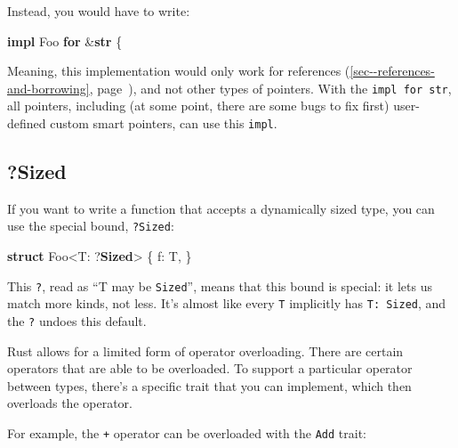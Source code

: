\documentclass[a4paper,]{book}
\renewcommand*{\hyperref}[2][\ar]{%
  \def\ar{#2}%
  #2 (\autoref{#1}, page~\pageref{#1})}
\newenvironment{Shaded}{\begin{snugshade}}{\end{snugshade}}
\newcommand{\KeywordTok}[1]{\textcolor[rgb]{0.13,0.29,0.53}{\textbf{{#1}}}}
\newcommand{\NormalTok}[1]{{#1}}
\begin{document}
Instead, you would have to write:

\begin{Shaded}
\begin{Highlighting}[]
\KeywordTok{impl} \NormalTok{Foo }\KeywordTok{for} \NormalTok{&}\KeywordTok{str} \NormalTok{\{}
\end{Highlighting}
\end{Shaded}

Meaning, this implementation would only work for
\hyperref[sec--references-and-borrowing]{references}, and not other
types of pointers. With the \texttt{impl\ for\ str}, all pointers,
including (at some point, there are some bugs to fix first) user-defined
custom smart pointers, can use this \texttt{impl}.

\subsection{?Sized}\label{sized}

If you want to write a function that accepts a dynamically sized type,
you can use the special bound, \texttt{?Sized}:

\begin{Shaded}
\begin{Highlighting}[]
\KeywordTok{struct} \NormalTok{Foo<T: ?}\KeywordTok{Sized}\NormalTok{> \{}
    \NormalTok{f: T,}
\NormalTok{\}}
\end{Highlighting}
\end{Shaded}

This \texttt{?}, read as ``T may be \texttt{Sized}'', means that this
bound is special: it lets us match more kinds, not less. It's almost
like every \texttt{T} implicitly has \texttt{T:\ Sized}, and the
\texttt{?} undoes this default.


Rust allows for a limited form of operator overloading. There are
certain operators that are able to be overloaded. To support a
particular operator between types, there's a specific trait that you can
implement, which then overloads the operator.

For example, the \texttt{+} operator can be overloaded with the
\texttt{Add} trait:
\end{document}
